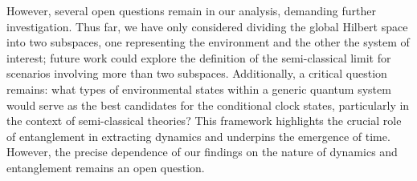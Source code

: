 However, several open questions remain in our analysis, demanding further investigation.  Thus far, we have only considered dividing the global Hilbert space into two subspaces, one representing the environment and the other the system of interest; future work could explore the definition of the semi-classical limit for scenarios involving more than two subspaces.  Additionally, a critical question remains: what types of environmental states within a generic quantum system would serve as the best candidates for the conditional clock states, particularly in the context of semi-classical theories? This framework highlights the crucial role of entanglement in extracting dynamics and underpins the emergence of time. However, the precise dependence of our findings on the nature of dynamics and entanglement remains an open question.